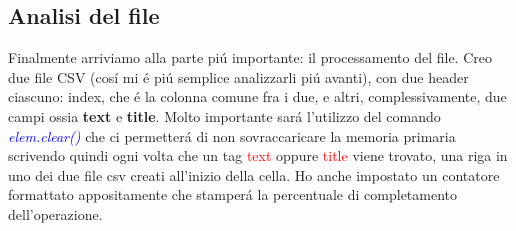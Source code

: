 \documentclass[12pt,a4paper]{article}
\begin{document}
    \subsection{Analisi del file}
    Finalmente arriviamo alla parte piú importante: il processamento del file.
    \newline
    Creo due file CSV (cosí mi é piú semplice analizzarli piú avanti), con due header ciascuno: index, che é la colonna comune fra i due, e altri, complessivamente, due campi ossia \textbf{text} e \textbf{title}. Molto importante sará l'utilizzo del comando \textit{\textcolor{blue}{elem.clear()}} che ci permetterá di non sovraccaricare la memoria primaria scrivendo quindi ogni volta che un tag \textcolor{red}{text} oppure \textcolor{red}{title} viene trovato, una riga in uno dei due file csv creati all'inizio della cella.
    \newline
    Ho anche impostato un contatore formattato appositamente che stamperá la percentuale di completamento dell'operazione.
\end{document}
